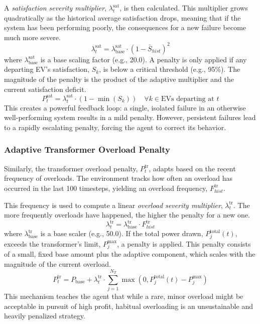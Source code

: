 A \textit{satisfaction severity multiplier}, $\lambda_t^{\text{sat}}$, is then calculated. This multiplier grows quadratically as the historical average satisfaction drops, meaning that if the system has been performing poorly, the consequences for a new failure become much more severe.
\begin{equation}
    \lambda_t^{\text{sat}} = \lambda_{\text{base}}^{\text{sat}} \cdot (1 - \bar{S}_{hist})^2
\end{equation}
where $\lambda_{\text{base}}^{\text{sat}}$ is a base scaling factor (e.g., 20.0). A penalty is only applied if any departing EV's satisfaction, $S_k$, is below a critical threshold (e.g., 95\%). The magnitude of the penalty is the product of the adaptive multiplier and the current satisfaction deficit.
\begin{equation}
    P_t^{\text{sat}} = \lambda_t^{\text{sat}} \cdot (1 - \min(S_k)) \quad \forall k \in \text{EVs departing at } t
\end{equation}
This creates a powerful feedback loop: a single, isolated failure in an otherwise well-performing system results in a mild penalty. However, persistent failures lead to a rapidly escalating penalty, forcing the agent to correct its behavior.

\subsubsection{Adaptive Transformer Overload Penalty}
Similarly, the transformer overload penalty, $P_t^{\text{tr}}$, adapts based on the recent frequency of overloads. The environment tracks how often an overload has occurred in the last 100 timesteps, yielding an overload frequency, $F_{hist}^{\text{tr}}$.

This frequency is used to compute a linear \textit{overload severity multiplier}, $\lambda_t^{\text{tr}}$. The more frequently overloads have happened, the higher the penalty for a new one.
\begin{equation}
    \lambda_t^{\text{tr}} = \lambda_{\text{base}}^{\text{tr}} \cdot F_{hist}^{\text{tr}}
\end{equation}
where $\lambda_{\text{base}}^{\text{tr}}$ is a base scaler (e.g., 50.0). If the total power drawn, $P_j^{\text{total}}(t)$, exceeds the transformer's limit, $P_j^{\text{max}}$, a penalty is applied. This penalty consists of a small, fixed base amount plus the adaptive component, which scales with the magnitude of the current overload.
\begin{equation}
    P_t^{\text{tr}} = P_{\text{base}} + \lambda_t^{\text{tr}} \cdot \sum_{j=1}^{N_T} \max(0, P_j^{\text{total}}(t) - P_j^{\text{max}})
\end{equation}
This mechanism teaches the agent that while a rare, minor overload might be acceptable in pursuit of high profit, habitual overloading is an unsustainable and heavily penalized strategy.

